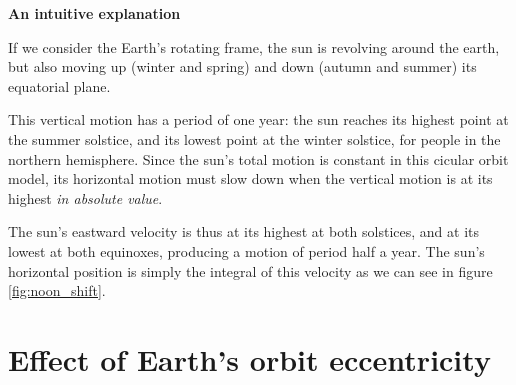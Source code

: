 \documentclass[12pt]{article}
\begin{document}
\textbf{An intuitive explanation}

If we consider the Earth's rotating frame,
the sun is revolving around the earth, but also moving up 
(winter and spring) and down (autumn and summer) its equatorial plane.

This vertical motion has a period of one year: the sun reaches its highest point
at the summer solstice, and its lowest point at the winter solstice, for people 
in the northern hemisphere. Since the sun's total motion is constant in this 
cicular orbit model, its horizontal motion must slow down when the vertical 
motion is at its highest \textit{in absolute value}. 

The sun's eastward velocity is thus at its highest
at both solstices, and at its lowest at both equinoxes, producing a
motion of period half a year. The sun's horizontal position is simply the
integral of this velocity as we can see in figure 
\ref{fig:noon_shift}.

\clearpage
\section{Effect of Earth's orbit eccentricity}
\end{document}
